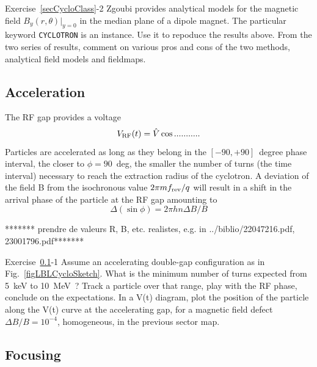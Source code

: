 \smallskip
\noindent {\small $\bullet$} Exercise~\ref{secCycloClass}-2 
Zgoubi provides analytical models 
 for the magnetic field ${B_y(r,\theta)|_{y=0}}$ in the median plane of a dipole magnet. 
The particular keyword \verb|CYCLOTRON| is an instance.  Use it to repoduce the results above. 
From the two series of results, comment on various pros and cons of the two methods, analytical field models and 
fieldmaps.


\subsection{Acceleration}\label{secCycloAccel}


The RF gap provides a voltage  
\begin{equation}
\label{EqRCyclo}
V_{\rm RF}(t) =\hat V \cos ........... 
\end{equation}
Particles are accelerated as long as they belong in the $[-90,+90]$~degree phase interval, 
the closer to $\phi=90$~deg, the smaller the number of turns 
(the time interval) necessary to reach the extraction radius of the cyclotron.
A deviation of the field B from the isochronous value $2\pi m f_{\rm rev}/q$
will result in a  shift in the arrival phase of the particle at the RF gap amounting to 
\begin{equation}
\label{EqPFPhaseCyclo}
\Delta (\sin \phi) = 2\pi h n \Delta B/B
\end{equation}

 ******* prendre de valeurs R, B, etc. realistes, e.g. in ../biblio/22047216.pdf, 23001796.pdf*******

\smallskip
\noindent {\small $\bullet$} Exercise~\ref{secCycloAccel}-1 
Assume an accelerating double-gap  configuration as in Fig.~\ref{figLBLCycloSketch}. 
What is the minimum number of turns  expected  from 5~keV to 10~MeV~? Track a particle over that range, 
play with the RF phase, conclude on the  expectations. 
In a V(t) diagram, plot  the position  of the particle along the V(t) curve at the 
accelerating gap, for a magnetic field defect 
$\Delta B/B= 10^{-4}$, homogeneous, in the previous sector  map. 




\subsection{Focusing  \label{secCycloFocus}}

